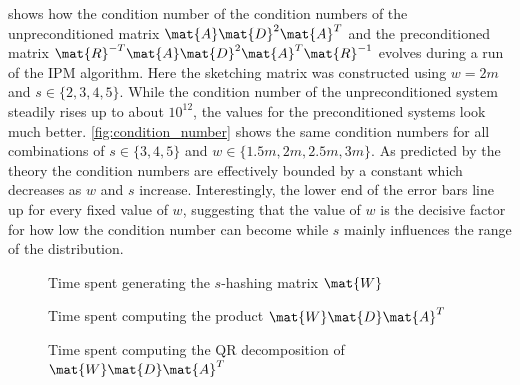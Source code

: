  shows how the condition number of the condition numbers of the unpreconditioned matrix \(\mat{A}\mat{D}^2\mat{A}^T\) and the preconditioned matrix \(\mat{R}^{-T}\mat{A}\mat{D}^2\mat{A}^T\mat{R}^{-1}\) evolves during a run of the IPM algorithm.
Here the sketching matrix was constructed using \(w=2m\) and \(s \in \{2, 3, 4, 5\}\).
While the condition number of the unpreconditioned system steadily rises up to about \(10^{12}\), the values for the preconditioned systems look much better.
\cref{fig:condition_number} shows the same condition numbers for all combinations of \(s \in \{3,4,5\}\) and \(w \in \{1.5m, 2m, 2.5m, 3m\}\).
As predicted by the theory the condition numbers are effectively bounded by a constant which decreases as \(w\) and \(s\) increase.
Interestingly, the lower end of the error bars line up for every fixed value of \(w\), suggesting that the value of \(w\) is the decisive factor for how low the condition number can become while \(s\) mainly influences the range of the distribution.

\begin{figure}[tbp]
  \centering
  \caption{Time spent generating the \(s\)-hashing matrix \(\mat{W}\)}%
  \label{fig:generate_sketch_duration}
\end{figure}

\begin{figure}[tbp]
  \centering%
  \caption{Time spent computing the product \(\mat{W}\mat{D}\mat{A}^T\)}%
  \label{fig:sketching_duration}
\end{figure}

\begin{figure}[tbp]
  \centering%
  \caption{Time spent computing the QR decomposition of \(\mat{W}\mat{D}\mat{A}^T\)}%
  \label{fig:decomposition_duration}
\end{figure}

